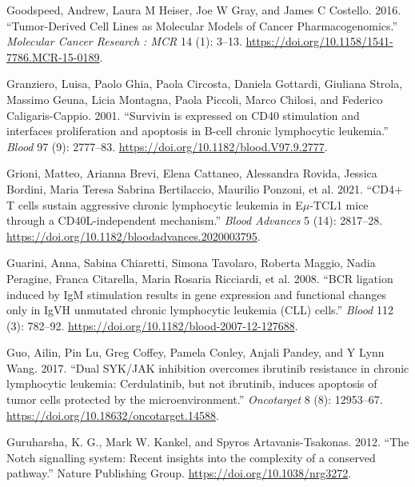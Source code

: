 \documentclass[11pt, a4paper, twosided]{book}
\newenvironment{CSLReferences}%
  {}%
  {\par}
\begin{document}
\begin{CSLReferences}{1}{0}
\leavevmode{}%
Goodspeed, Andrew, Laura M Heiser, Joe W Gray, and James C Costello. 2016. {``{Tumor-Derived Cell Lines as Molecular Models of Cancer Pharmacogenomics.}''} \emph{Molecular Cancer Research : MCR} 14 (1): 3--13. \url{https://doi.org/10.1158/1541-7786.MCR-15-0189}.

\leavevmode{}%
Granziero, Luisa, Paolo Ghia, Paola Circosta, Daniela Gottardi, Giuliana Strola, Massimo Geuna, Licia Montagna, Paola Piccoli, Marco Chilosi, and Federico Caligaris-Cappio. 2001. {``{Survivin is expressed on CD40 stimulation and interfaces proliferation and apoptosis in B-cell chronic lymphocytic leukemia}.''} \emph{Blood} 97 (9): 2777--83. \url{https://doi.org/10.1182/blood.V97.9.2777}.

\leavevmode{}%
Grioni, Matteo, Arianna Brevi, Elena Cattaneo, Alessandra Rovida, Jessica Bordini, Maria Teresa Sabrina Bertilaccio, Maurilio Ponzoni, et al. 2021. {``{CD4+ T cells sustain aggressive chronic lymphocytic leukemia in E\(\mu\)-TCL1 mice through a CD40L-independent mechanism}.''} \emph{Blood Advances} 5 (14): 2817--28. \url{https://doi.org/10.1182/bloodadvances.2020003795}.

\leavevmode{}%
Guarini, Anna, Sabina Chiaretti, Simona Tavolaro, Roberta Maggio, Nadia Peragine, Franca Citarella, Maria Rosaria Ricciardi, et al. 2008. {``{BCR ligation induced by IgM stimulation results in gene expression and functional changes only in IgVH unmutated chronic lymphocytic leukemia (CLL) cells}.''} \emph{Blood} 112 (3): 782--92. \url{https://doi.org/10.1182/blood-2007-12-127688}.

\leavevmode{}%
Guo, Ailin, Pin Lu, Greg Coffey, Pamela Conley, Anjali Pandey, and Y Lynn Wang. 2017. {``{Dual SYK/JAK inhibition overcomes ibrutinib resistance in chronic lymphocytic leukemia: Cerdulatinib, but not ibrutinib, induces apoptosis of tumor cells protected by the microenvironment.}''} \emph{Oncotarget} 8 (8): 12953--67. \url{https://doi.org/10.18632/oncotarget.14588}.

\leavevmode{}%
Guruharsha, K. G., Mark W. Kankel, and Spyros Artavanis-Tsakonas. 2012. {``{The Notch signalling system: Recent insights into the complexity of a conserved pathway}.''} Nature Publishing Group. \url{https://doi.org/10.1038/nrg3272}.


\end{CSLReferences}
\end{document}
